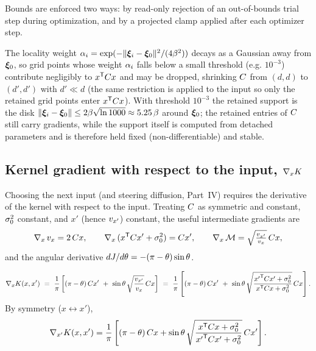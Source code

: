 \begin{sloppypar}
Bounds are enforced two ways: by read-only rejection of an out-of-bounds trial
step during optimization, and by a projected clamp applied after each optimizer
step.
\end{sloppypar}

\begin{remark}
The locality weight $\alpha_i=\exp(-\lVert\bm{\xi}_i-\bm{\xi}_{0}\rVert^2/(4\beta^2))$ decays as
a Gaussian away from $\bm{\xi}_{0}$, so grid points whose weight $\alpha_i$ falls below a
small threshold (e.g. $10^{-3}$) contribute negligibly to $x^{\mathsf{T}}C x$ and
may be dropped, shrinking $C$ from $(d,d)$ to $(d',d')$ with $d'\ll d$ (the
same restriction is applied to the input so only the retained grid points enter
$x^{\mathsf{T}}C x$). With threshold $10^{-3}$ the retained support is the disk
$\lVert\bm{\xi}_i-\bm{\xi}_{0}\rVert\le2\beta\sqrt{\ln1000}\approx5.25\,\beta$ around $\bm{\xi}_{0}$;
the retained entries of $C$ still carry gradients, while the support itself is
computed from detached parameters and is therefore held fixed
(non-differentiable) and stable.
\end{remark}

\subsection{Kernel gradient with respect to the input, $\nabla_xK$}
\label{subsec:gradxK}

Choosing the next input (and steering diffusion, Part~IV) requires the derivative
of the kernel with respect to the input. Treating $C$ as symmetric and
constant, $\sigma_{0}^2$ constant, and $x'$ (hence $v_{x'}$) constant, the useful
intermediate gradients are
\begin{equation}
\nabla_x\,v_x=2\,C x,
\qquad
\nabla_x\,(x^{\mathsf{T}}C x'+\sigma_{0}^2)=C x',
\qquad
\nabla_x\,\mathcal{M}=\sqrt{\tfrac{v_{x'}}{v_x}}\,C x,
\end{equation}
and the angular derivative $dJ/d\theta=-(\pi-\theta)\sin\theta$.

\begin{proposition}
\begin{equation}
\nabla_xK(x,x')
\ =\ \frac{1}{\pi}\left[(\pi-\theta)\,C x'
\ +\ \sin\theta\,\sqrt{\frac{v_{x'}}{v_x}}\,C x\right]
\ =\ \frac{1}{\pi}\left[(\pi-\theta)\,C x'
\ +\ \sin\theta\,\sqrt{\frac{{x'}^{\mathsf{T}}C x'+\sigma_{0}^2}{x^{\mathsf{T}}C x+\sigma_{0}^2}}\,C x\right].
\label{eq:gradxK}
\end{equation}
By symmetry ($x\leftrightarrow x'$),
\begin{equation}
\nabla_{x'}K(x,x')
=\frac{1}{\pi}\left[(\pi-\theta)\,C x
+\sin\theta\,\sqrt{\frac{x^{\mathsf{T}}C x+\sigma_{0}^2}{{x'}^{\mathsf{T}}C x'+\sigma_{0}^2}}\,C x'\right].
\end{equation}
\end{proposition}

